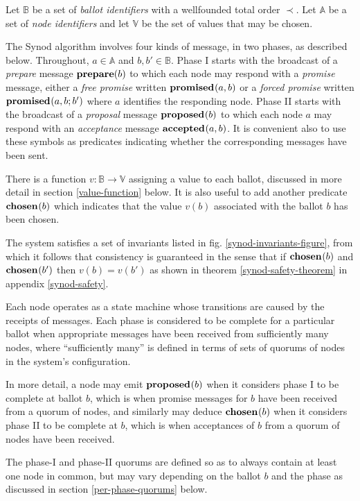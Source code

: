 \documentclass[journal]{IEEEtran}
\begin{document}
Let $\mathbb B$ be a set of \textit{ballot identifiers} with a wellfounded
total order $\prec$. Let $\mathbb A$ be a set of \textit{node identifiers} and
let $\mathbb V$ be the set of values that may be chosen.

The Synod algorithm involves four kinds of message, in two phases, as described
below.  Throughout, $a \in \mathbb A$ and $b, b' \in \mathbb B$.  Phase I
starts with the broadcast of a \textit{prepare} message $\mathbf{prepare}(b)$ to which
each node may respond with a \textit{promise} message, either a \textit{free
promise} written $\mathbf{promised}_{}(a,b)$ or a \textit{forced promise} written
$\mathbf{promised}_{}(a,b;b')$ where $a$ identifies the responding node.  Phase II starts
with the broadcast of a \textit{proposal} message $\mathbf{proposed}_{}(b)$ to which each
node $a$ may respond with an \textit{acceptance} message $\mathbf{accepted}_{}(a,b)$. It is
convenient also to use these symbols as predicates indicating whether the
corresponding messages have been sent.

There is a function $v : \mathbb B \to \mathbb V$ assigning a value to each
ballot, discussed in more detail in section \ref{value-function} below.  It is
also useful to add another predicate $\mathbf{chosen}_{}(b)$ which indicates that the
value $v(b)$ associated with the ballot $b$ has been chosen.

The system satisfies a set of invariants listed in fig.
\ref{synod-invariants-figure}, from which it follows that consistency is
guaranteed in the sense that if $\mathbf{chosen}_{}(b)$ and $\mathbf{chosen}_{}(b')$ then $v(b) =
v(b')$ as shown in theorem \ref{synod-safety-theorem} in appendix
\ref{synod-safety}.

Each node operates as a state machine whose transitions are caused by the
receipts of messages. Each phase is considered to be complete for a particular
ballot when appropriate messages have been received from sufficiently many
nodes, where ``sufficiently many'' is defined in terms of sets of quorums of
nodes in the system's configuration.

In more detail, a node may emit $\mathbf{proposed}_{}(b)$ when it considers phase I to be
complete at ballot $b$, which is when promise messages for $b$ have been
received from a quorum of nodes, and similarly may deduce $\mathbf{chosen}_{}(b)$ when
it considers phase II to be complete at $b$, which is when acceptances of $b$
from a quorum of nodes have been received.

The phase-I and phase-II quorums are defined so as to always contain at least
one node in common, but may vary depending on the ballot $b$ and the phase as
discussed in section \ref{per-phase-quorums} below.
\end{document}
